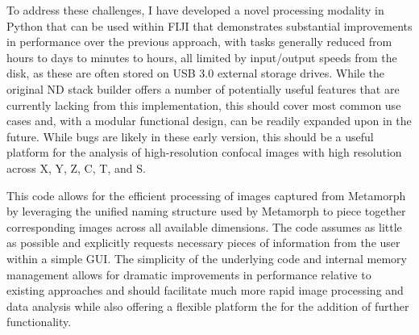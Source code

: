 To address these challenges, I have developed a novel processing modality in Python that can be used within FIJI that demonstrates substantial improvements in performance over the previous approach, with tasks generally reduced from hours to days to minutes to hours, all limited by input/output speeds from the disk, as these are often stored on USB 3.0 external storage drives. While the original ND stack builder offers a number of potentially useful features that are currently lacking from this implementation, this should cover most common use cases and, with a modular functional design, can be readily expanded upon in the future. While bugs are likely in these early version, this should be a useful platform for the analysis of high\hyp{}resolution confocal images with high resolution across X, Y, Z, C, T, and S. 

\begin{code}
\caption{This code allows for the efficient processing of images captured from Metamorph by leveraging the unified naming structure used by Metamorph to piece together corresponding images across all available dimensions. The code assumes as little as possible and explicitly requests necessary pieces of information from the user within a simple GUI. The simplicity of the underlying code and internal memory management allows for dramatic improvements in performance relative to existing approaches and should facilitate much more rapid image processing and data analysis while also offering a flexible platform the for the addition of further functionality.}
\label{metamorpher}

\inputminted[breaklines,frame=single,fontsize=\small]{python}{source/metamorphTimeLapse.py}

\end{code}

